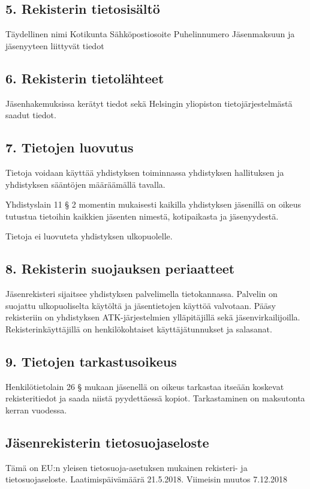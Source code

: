 \documentclass[finnish]{tktltiki}
\begin{document}
\subsection*{5. Rekisterin tietosisältö}
Täydellinen nimi
Kotikunta
Sähköpostiosoite
Puhelinnumero
Jäsenmaksuun ja jäsenyyteen liittyvät tiedot

\subsection*{6. Rekisterin tietolähteet}
Jäsenhakemuksissa kerätyt tiedot sekä Helsingin yliopiston tietojärjestelmästä saadut tiedot.

\subsection*{7. Tietojen luovutus}
Tietoja voidaan käyttää yhdistyksen toiminnassa yhdistyksen hallituksen ja yhdistyksen sääntöjen määräämällä tavalla.

Yhdistyslain 11 § 2 momentin mukaisesti kaikilla yhdistyksen jäsenillä on oikeus tutustua tietoihin kaikkien jäsenten nimestä, kotipaikasta ja jäsenyydestä.

Tietoja ei luovuteta yhdistyksen ulkopuolelle.

\subsection*{8. Rekisterin suojauksen periaatteet}
Jäsenrekisteri sijaitsee yhdistyksen palvelimella tietokannassa. Palvelin on suojattu ulkopuoliselta käytöltä ja jäsentietojen käyttöä valvotaan. Pääsy rekisteriin on yhdistyksen ATK-järjestelmien ylläpitäjillä sekä jäsenvirkailijoilla. Rekisterinkäyttäjillä on henkilökohtaiset käyttäjätunnukset ja salasanat.

\subsection*{9. Tietojen tarkastusoikeus}
Henkilötietolain 26 § mukaan jäsenellä on oikeus tarkastaa itseään koskevat rekisteritiedot ja saada niistä pyydettäessä kopiot. Tarkastaminen on maksutonta kerran vuodessa.

\pagestyle{empty}


\subsection*{Jäsenrekisterin tietosuojaseloste}
Tämä on EU:n yleisen tietosuoja-asetuksen mukainen rekisteri- ja tietosuojaseloste.
Laatimispäivämäärä 21.5.2018. Viimeisin muutos 7.12.2018
\end{document}

